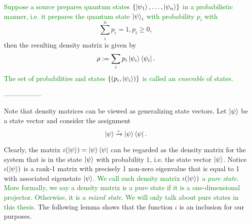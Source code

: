 \begin{definition}

\textcolor{green}{Suppose a source prepares quantum states $\{\ket{\psi_1},\hdots,\ket{\psi_n}\}$ in a probabilistic manner, i.e. it prepares the quantum state $\ket{\psi}_i$ with probability $p_i$ with}
 \begin{equation}
\sum\limits_i^n p_i=1, p_i \geq 0,
\end{equation}
then the resulting density matrix is given by
\begin{equation}
    \rho:=\sum_i p_i \ket{\psi_i}\bra{\psi_i}.
\end{equation}
\textcolor{green}{The set of probabilities and states $\{(p_i, \ket{\psi_i})\}$ is called an \textit{ensemble} of states.}

\end{definition}
-----------------

Note that density matrices can be viewed as generalizing state vectors.  Let $\ket{\psi}$ be a state vector and consider the assignment
$$\ket{\psi} \xrightarrow{\iota} \ket{\psi}\bra{\psi}.$$

Clearly, the matrix $\iota(\ket{\psi})=\ket{\psi}\bra{\psi}$ can be regarded as the density matrix for the system that is in the state $\ket{\psi}$ with probability $1$, i.e. the state vector $\ket{\psi}$. Notice $\iota({\ket{\psi}})$ is a rank-1 matrix with precisely 1 non-zero eigenvalue that is equal to 1 with associated eigenstate $\ket{\psi}$.
\textcolor{green}{We call such density matrix $\iota(\ket{\psi})$ a \textit{pure state}. More formally, we say a density matrix is a pure state if it is a one-dimensional projector. Otherwise, it is a \textit{mixed state}. We will only talk about pure states in this thesis.}
The following lemma shows that the function $\iota$ is an inclusion for our purposes.

